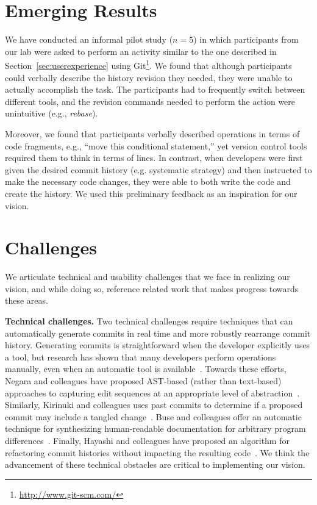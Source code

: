 \documentclass[conference]{IEEEtran}
\begin{document}
\section{Emerging Results}

We have conducted an informal pilot study ($n = 5$) in which participants from our lab were asked to perform an activity similar to the one described in Section~\ref{sec:userexperience} using Git\footnote{\url{http://www.git-scm.com/}}.
We found that although participants could verbally describe the history revision they needed, they were unable to actually accomplish the task. The participants had to frequently switch between different tools, and the revision commands needed to perform the action were unintuitive (e.g., \emph{rebase}).

Moreover, we found that participants verbally described operations in terms of code fragments, e.g., ``move this conditional statement,'' yet version control tools required them to think in terms of lines. 
In contrast, when developers were first given the desired commit history (e.g. systematic strategy) and then instructed to make the necessary code changes, they were able to both write the code and create the history. 
We used this preliminary feedback as an inspiration for our vision.


\section{Challenges}
\label{sec:challenges}
We articulate technical and usability challenges that we face in realizing our vision, and while doing so, reference related work that makes progress towards these areas.  

\textbf{Technical challenges.} Two technical challenges require techniques that can automatically generate commits in real time and more robustly rearrange commit history.
Generating commits is straightforward when the developer explicitly uses a tool, but research has shown that many developers perform operations manually, even when an automatic tool is available~\cite{Murphy-Hill2012c}.
Towards these efforts, Negara and colleagues have proposed AST-based (rather than text-based) approaches to capturing edit sequences at an appropriate level of abstraction~\cite{Negara2012}. Similarly, Kirinuki and colleagues uses past commits to determine if a proposed commit may include a tangled change~\cite{Kirinuki2014}. 
Buse and colleagues offer an automatic technique for synthesizing human-readable documentation for arbitrary program differences~\cite{Buse2010}.
Finally, Hayashi and colleagues have proposed an algorithm for refactoring commit histories without impacting the resulting code~\cite{Hayashi2012}. 
We think the advancement of these technical obstacles are critical to implementing our vision.
\end{document}
